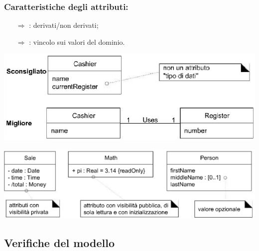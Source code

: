 \subsubsection{Caratteristiche degli attributi:}

\begin{itemize}
    \item [$\Rightarrow$] : derivati/non derivati;
    \item [$\Rightarrow$] : vincolo sui valori del dominio.
\end{itemize}

\begin{center}
    \includegraphics[scale=0.5]{images/Attributi2.png}
\end{center}


\begin{center}
    \includegraphics[scale=0.5]{images/Notazione attributi.png}
\end{center}


\subsection{Verifiche del modello}

